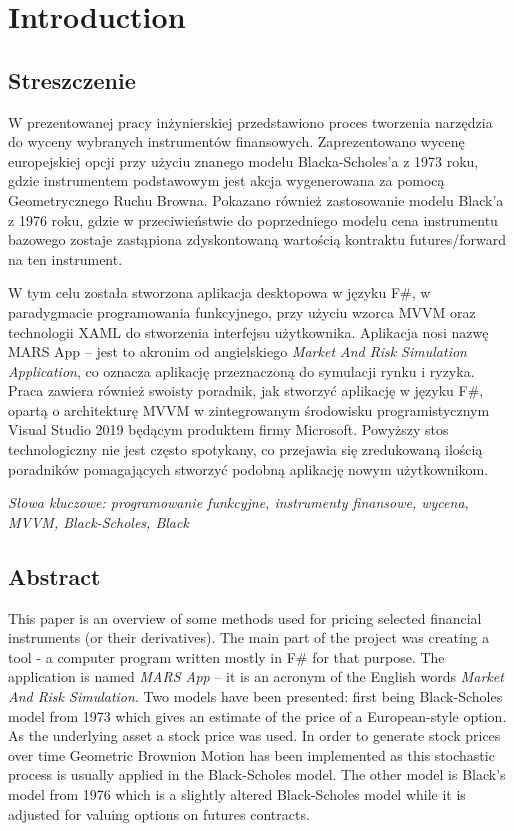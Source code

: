 \chapter{Introduction}
\section{Streszczenie}
    W prezentowanej pracy inżynierskiej przedstawiono proces tworzenia narzędzia do wyceny wybranych instrumentów finansowych. Zaprezentowano wycenę europejskiej opcji przy użyciu znanego modelu Blacka-Scholes'a z 1973 roku, gdzie instrumentem podstawowym jest akcja wygenerowana za pomocą Geometrycznego Ruchu Browna. Pokazano również zastosowanie modelu Black'a z 1976 roku, gdzie w przeciwieństwie do poprzedniego modelu cena instrumentu bazowego zostaje zastąpiona zdyskontowaną wartością kontraktu futures/forward na ten instrument.
    
    W tym celu została stworzona aplikacja desktopowa w języku F\#, w paradygmacie programowania funkcyjnego, przy użyciu wzorca MVVM oraz technologii XAML do stworzenia interfejsu użytkownika. Aplikacja nosi nazwę MARS App -- jest to akronim od angielskiego \textit{Market And Risk Simulation Application}, co oznacza aplikację przeznaczoną do symulacji rynku i ryzyka. Praca zawiera również swoisty poradnik, jak stworzyć aplikację w języku F\#, opartą o architekturę MVVM w zintegrowanym środowisku programistycznym Visual Studio 2019 będącym produktem firmy Microsoft. Powyższy stos technologiczny nie jest często spotykany, co przejawia się zredukowaną ilością poradników pomagających stworzyć podobną aplikację nowym użytkownikom.
    
    \emph{Słowa kluczowe: programowanie funkcyjne, instrumenty finansowe, wycena, MVVM, Black-Scholes, Black}

\section{Abstract}
    This paper is an overview of some methods used for pricing selected financial instruments (or their derivatives). The main part of the project was creating a tool - a computer program written mostly in F\# for that purpose. The application is named \textit{MARS App} -- it is an acronym  of the English words \textit{Market And Risk Simulation}. Two models have been presented: first being Black-Scholes model from 1973 which gives an estimate of the price of a European-style option. As the underlying asset a stock price was used. In order to generate stock prices over time Geometric Brownion Motion has been implemented as this stochastic process is usually applied in the Black-Scholes model. The other model is Black's model from 1976 which is a slightly altered Black-Scholes model while it is adjusted for valuing options on futures contracts.
    

